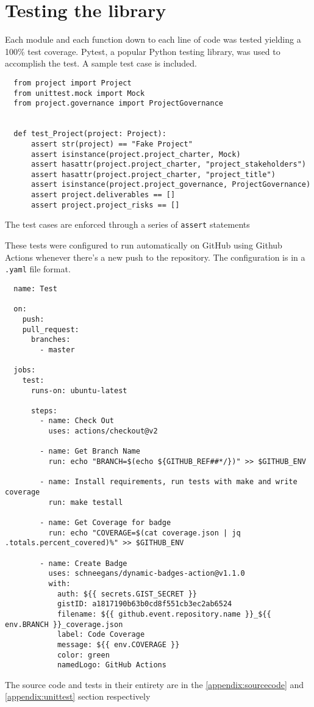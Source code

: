 \section{Testing the library}
Each module and each function down to each line of code was tested yielding a 100\% test coverage. Pytest, a popular Python testing library, was used to accomplish the test. A sample test case is included.

\begin{lstlisting}
  from project import Project
  from unittest.mock import Mock
  from project.governance import ProjectGovernance


  def test_Project(project: Project):
      assert str(project) == "Fake Project"
      assert isinstance(project.project_charter, Mock)
      assert hasattr(project.project_charter, "project_stakeholders")
      assert hasattr(project.project_charter, "project_title")
      assert isinstance(project.project_governance, ProjectGovernance)
      assert project.deliverables == []
      assert project.project_risks == []
\end{lstlisting}

The test cases are enforced through a series of \verb+assert+ statements

These tests were configured to run automatically on GitHub using Github Actions whenever there's a new push to the repository. The configuration is in a \verb+.yaml+ file format.

\pagebreak

\begin{lstlisting}
  name: Test

  on:
    push:
    pull_request:
      branches:
        - master

  jobs:
    test:
      runs-on: ubuntu-latest

      steps:
        - name: Check Out
          uses: actions/checkout@v2

        - name: Get Branch Name
          run: echo "BRANCH=$(echo ${GITHUB_REF##*/})" >> $GITHUB_ENV

        - name: Install requirements, run tests with make and write coverage
          run: make testall

        - name: Get Coverage for badge
          run: echo "COVERAGE=$(cat coverage.json | jq .totals.percent_covered)%" >> $GITHUB_ENV

        - name: Create Badge
          uses: schneegans/dynamic-badges-action@v1.1.0
          with:
            auth: ${{ secrets.GIST_SECRET }}
            gistID: a1817190b63b0cd8f551cb3ec2ab6524
            filename: ${{ github.event.repository.name }}_${{ env.BRANCH }}_coverage.json
            label: Code Coverage
            message: ${{ env.COVERAGE }}
            color: green
            namedLogo: GitHub Actions

\end{lstlisting}

The source code and tests in their entirety are in the \autoref{appendix:sourcecode} and \autoref{appendix:unittest} section respectively
